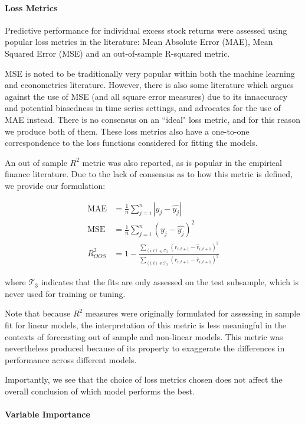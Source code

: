 \documentclass[11pt, a4paper, table]{article}
\begin{document}
\paragraph{Loss Metrics}

Predictive performance for individual excess stock returns were assessed using popular loss metrics in the literature: Mean Absolute Error (MAE), Mean Squared Error (MSE) and an out-of-sample R-squared metric.


MSE is noted to be traditionally very popular within both the machine learning and econometrics literature. However, there is also some literature which argues against the use of MSE (and all square error measures) due to its innaccuracy and potential biasedness in time series settings, and advocates for the use of MAE instead. There is no consensus on an ``ideal" loss metric, and for this reason we produce both of them. These loss metrics also have a one-to-one correspondence to the loss functions considered for fitting the models.

An out of sample $R^2$ metric was also reported, as is popular in the empirical finance literature. Due to the lack of consensus as to how this metric is defined, we provide our formulation: 

\begin{align}
\text{MAE} &= \frac{1}{n} \sum_{j = i}^{n} |y_j - \hat{y_j}| \\
\text{MSE} &= \frac{1}{n} \sum_{j = i}^{n} \left( y_j - \hat{y_j}\right) ^2 \\
R^2_{OOS} &= 1 - \frac{\sum_{(i, t)\in\mathcal{T}_3}(r_{i, t+1} - \widehat{r}_{i, t+1})^2}
{\sum_{(i, t)\in\mathcal{T}_3} \left( r_{i, t+1} - \bar{r}_{i, t+1} \right) ^2}
\end{align}

where $\mathcal{T}_3$ indicates that the fits are only assessed on the test subsample, which is never used for training or tuning.

Note that because $R^2$ measures were originally formulated for assessing in sample fit for linear models, the interpretation of this metric is less meaningful in the contexts of forecasting out of sample and non-linear models. This metric was nevertheless produced because of its property to exaggerate the differences in performance across different models.

Importantly, we see that the choice of loss metrics chosen does not affect the overall conclusion of which model performs the best.

\paragraph{Variable Importance}
\end{document}
